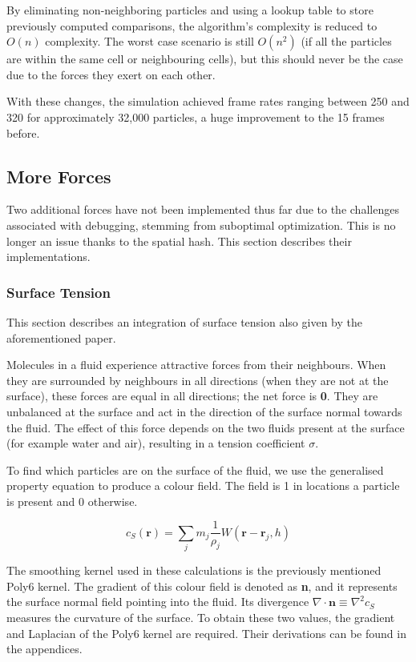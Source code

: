 \documentclass[12pt]{article}
\begin{document}
    By eliminating non-neighboring particles and using a lookup table to store previously computed comparisons, the algorithm's complexity is reduced to $O(n)$ complexity. The worst case scenario is still $O(n^2)$ (if all the particles are within the same cell or neighbouring cells), but this should never be the case due to the forces they exert on each other. 

    With these changes, the simulation achieved frame rates ranging between 250 and 320 for approximately 32,000 particles, a huge improvement to the 15 frames before.

    \subsection{More Forces}

    Two additional forces have not been implemented thus far due to the challenges associated with debugging, stemming from suboptimal optimization. This is no longer an issue thanks to the spatial hash. This section describes their implementations.

    \subsubsection{Surface Tension}

    This section describes an integration of surface tension also given by the aforementioned paper\cite{sca}.

    Molecules in a fluid experience attractive forces from their neighbours. When they are surrounded by neighbours in all directions (when they are not at the surface), these forces are equal in all directions; the net force is \textbf{0}. They are unbalanced at the surface and act in the direction of the surface normal towards the fluid. The effect of this force depends on the two fluids present at the surface (for example water and air), resulting in a tension coefficient $\sigma$.

    To find which particles are on the surface of the fluid, we use the generalised property equation to produce a colour field. The field is 1 in locations a particle is present and 0 otherwise.

    \begin{equation}
        c_S(\textbf{r}) = \sum_{j}{m_j \frac{1}{\rho_j}W(\textbf{r} - \textbf{r}_j, h)}
    \end{equation}

    The smoothing kernel used in these calculations is the previously mentioned Poly6 kernel. The gradient of this colour field is denoted as \textbf{n}, and it represents the surface normal field pointing into the fluid. Its divergence $\nabla \cdot \textbf{n} \equiv \nabla^2 c_S$ measures the curvature of the surface. To obtain these two values, the gradient and Laplacian of the Poly6 kernel are required. Their derivations can be found in the appendices.
\end{document}
